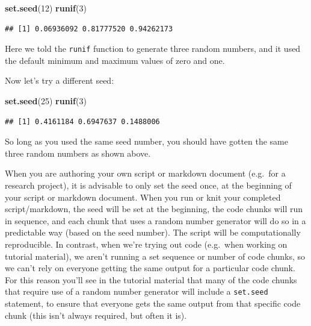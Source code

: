 \documentclass[
]{book}
\newenvironment{Shaded}{\begin{snugshade}}{\end{snugshade}}
\newcommand{\DecValTok}[1]{\textcolor[rgb]{0.00,0.00,0.81}{#1}}
\newcommand{\FunctionTok}[1]{\textcolor[rgb]{0.13,0.29,0.53}{\textbf{#1}}}
\newcommand{\NormalTok}[1]{#1}
\begin{document}
\begin{Shaded}
\begin{Highlighting}[]
\FunctionTok{set.seed}\NormalTok{(}\DecValTok{12}\NormalTok{)}
\FunctionTok{runif}\NormalTok{(}\DecValTok{3}\NormalTok{)}
\end{Highlighting}
\end{Shaded}

\begin{verbatim}
## [1] 0.06936092 0.81777520 0.94262173
\end{verbatim}

Here we told the \texttt{runif} function to generate three random numbers, and it used the default minimum and maximum values of zero and one.

Now let's try a different seed:

\begin{Shaded}
\begin{Highlighting}[]
\FunctionTok{set.seed}\NormalTok{(}\DecValTok{25}\NormalTok{)}
\FunctionTok{runif}\NormalTok{(}\DecValTok{3}\NormalTok{)}
\end{Highlighting}
\end{Shaded}

\begin{verbatim}
## [1] 0.4161184 0.6947637 0.1488006
\end{verbatim}

So long as you used the same seed number, you should have gotten the same three random numbers as shown above.

When you are authoring your own script or markdown document (e.g.~for a research project), it is advisable to only set the seed once, at the beginning of your script or markdown document. When you run or knit your completed script/markdown, the seed will be set at the beginning, the code chunks will run in sequence, and each chunk that uses a random number generator will do so in a predictable way (based on the seed number). The script will be computationally reproducible. In contrast, when we're trying out code (e.g.~when working on tutorial material), we aren't running a set sequence or number of code chunks, so we can't rely on everyone getting the same output for a particular code chunk. For this reason you'll see in the tutorial material that many of the code chunks that require use of a random number generator will include a \texttt{set.seed} statement, to ensure that everyone gets the same output from that specific code chunk (this isn't always required, but often it is).
\end{document}
